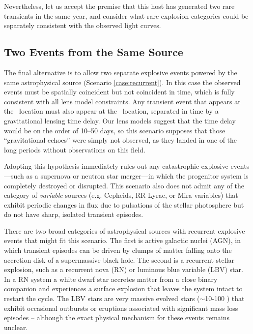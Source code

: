 
Nevertheless, let us accept the premise that this host has generated
two rare transients in the same year, and consider what rare
explosion categories could be separately consistent with the observed
light curves.




\subsection{Two Events from the Same Source}

The final alternative is to allow two separate explosive events
powered by the same astrophysical source (Scenario
\ref{case:recurrent}).  In this case the observed events must be
spatially coincident but not coincident in time, which is fully
consistent with all lens model constraints.  Any transient event that
appears at the \spockone\ location must also appear at the
\spocktwo\ location, separated in time by a gravitational lensing time
delay.  Our lens models suggest that the time delay would be on the
order of 10--50 days, so this scenario supposes that those
``gravitational echoes'' were simply not observed, as they landed in
one of the long periods without \HST observations on this field.

Adopting this hypothesis immediately rules out any catastrophic
explosive events---such as a supernova or neutron star merger---in
which the progenitor system is completely destroyed or disrupted. This
scenario also does not admit any of the category of {\it variable}
sources (e.g. Cepheids, RR Lyrae, or Mira variables) that exhibit
periodic changes in flux due to pulsations of the stellar photosphere
but do not have sharp, isolated transient episodes.

There are two broad categories of astrophysical sources with
recurrent explosive events that might fit this scenario.  The first is
active galactic nuclei (AGN), in which transient episodes can be
driven by clumps of matter falling onto the accretion disk of a
supermassive black hole.  The second is a recurrent stellar explosion,
such as a recurrent nova (RN) or luminous blue variable (LBV) star.
In a RN system a white dwarf star accretes matter from a close binary
companion and experiences a surface explosion that leaves the system
intact to restart the cycle.  The LBV stars are very massive evolved
stars ($\sim$10-100 \Msun) that exhibit occasional outbursts or
eruptions associated with significant mass loss episodes -- although
the exact physical mechanism for these events remains unclear.

